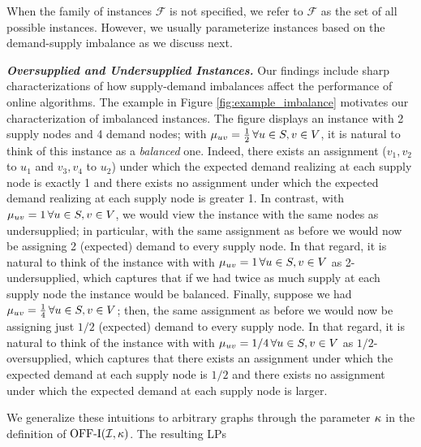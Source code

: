 When the family of instances $\mathcal{F}$ is not specified, we refer to $\mathcal{F}$ as the set of all possible instances. However, we usually parameterize instances based on the demand-supply imbalance as we discuss next.

\textbf{\emph{Oversupplied and Undersupplied Instances.}}
Our findings include sharp characterizations of how supply-demand imbalances affect the performance of online algorithms. The example in Figure \ref{fig:example_imbalance} motivates our characterization of imbalanced instances. The figure displays an instance with 2 supply nodes and 4 demand nodes; with  $\mu_{uv}=\frac{1}{2} \, \forall u\in S,v\in V$, it is natural to think of this instance as a \emph{balanced} one. Indeed, there exists an assignment ($v_1,v_2$ to $u_1$ and $v_3,v_4$ to $u_2$) under which the expected demand realizing at each supply node is exactly 1 and there exists no assignment under which the expected demand realizing at each supply node is greater 1. In contrast, with $\mu_{uv}=1 \, \forall u\in S,v\in V$, we would view the instance with the same nodes as undersupplied; in particular, with the same assignment as before we would now be assigning 2 (expected) demand to every supply node. In that regard, it is natural to think of the instance with with $\mu_{uv}=1 \, \forall u\in S,v\in V$ as 2-undersupplied, which captures that if we had twice as much supply at each supply node the instance would be balanced. Finally, suppose we had  $\mu_{uv}=\frac{1}{4} \, \forall u\in S,v\in V$; then, the same assignment as before we would now be assigning just $1/2$ (expected) demand to every supply node. In that regard, it is natural to think of the instance with with $\mu_{uv}=1/4 \, \forall u\in S,v\in V$ as $1/2$-oversupplied, which captures that there exists an assignment under which the expected demand at each supply node is $1/2$ and there exists no assignment under which the expected demand at each supply node is larger.

We generalize these intuitions to arbitrary graphs through the parameter $\kappa$ in the definition of $\mathrm{\mathrm{OFF}}\textrm{-}\mathrm{I}(\mathcal I,\kappa)$. The resulting LPs

